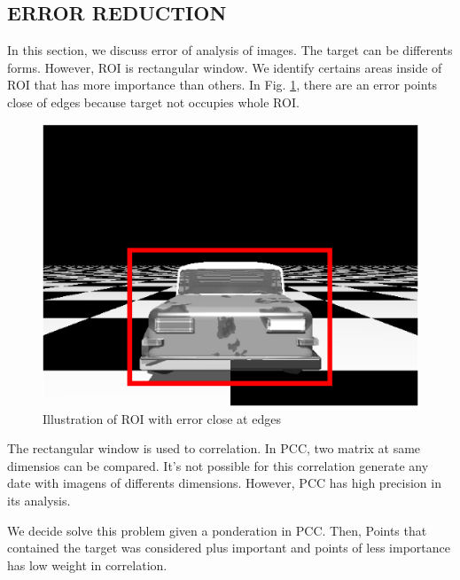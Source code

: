 \subsection{ERROR REDUCTION}

In this section, we discuss error of analysis of images. The target can be differents forms. However, 
ROI is rectangular window. We identify certains areas inside of ROI that has more importance than others.
In Fig. \ref{fig:erroridentified}, there are an error points close of edges because target not occupies whole ROI. 

\begin{figure}[H]
\includegraphics[width=\columnwidth]{images/imageError.eps}
\caption{Illustration of ROI with error close at edges}
\label{fig:erroridentified}
\end{figure}

The rectangular window is used to correlation. In PCC, two matrix at same dimensios can be compared. 
It's not possible for this correlation generate any date with imagens of differents dimensions. 
However, PCC has high precision in its analysis.

We decide solve this problem given a ponderation in PCC. Then, Points that contained the target was considered plus important
and points of less importance has low weight in correlation.

